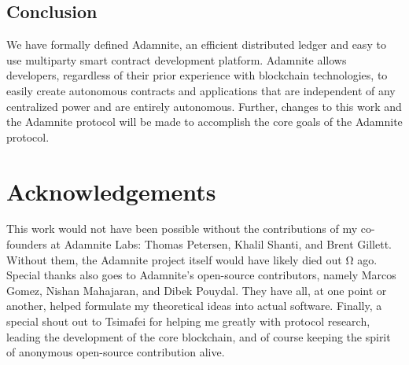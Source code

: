\documentclass[conference]{IEEEtran}
\begin{document}
\subsection{Conclusion}
We have formally defined Adamnite, an efficient distributed ledger and easy to use multiparty smart contract development platform. Adamnite allows developers, regardless of their prior experience with blockchain technologies, to easily create autonomous contracts and applications that are independent of any centralized power and are entirely autonomous. Further, changes to this work and the Adamnite protocol will be made to accomplish the core goals of the Adamnite protocol. 
\section{Acknowledgements}
This work would not have been possible without the contributions of my co-founders at Adamnite Labs: Thomas Petersen, Khalil Shanti, and Brent Gillett. Without them, the Adamnite project itself would have likely died out Ω ago. Special thanks also goes to Adamnite's open-source contributors, namely Marcos Gomez, Nishan Mahajaran, and Dibek Pouydal. They have all, at one point or another, helped formulate my theoretical ideas into actual software. Finally, a special shout out to Tsimafei for helping me greatly with protocol research, leading the development of the core blockchain, and of course keeping the spirit of anonymous open-source contribution alive. 
\end{document}
